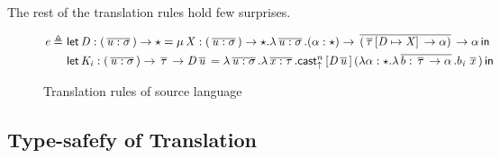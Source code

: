 The rest of the translation rules hold few surprises.

\begin{figure*}
\ottdefnctxtrans{}
\ottdefnpgmtrans{}
\ottdefndecltrans{}
\begin{align*}
\mathit{e}  \triangleq ~  &  \mathsf{let} \, \mathit{D}  :  (  \,\overline{  \mathit{u}  :  \sigma  }\,  )  \rightarrow  \star  =  \mu \, \mathit{X}  :  (  \,\overline{  \mathit{u}  :  \sigma  }\,  )  \rightarrow  \star  .  \lambda  \,\overline{  \mathit{u}  :  \sigma  }\,  .  (  \alpha  :  \star  )  \rightarrow  \,\overline{  (  \,\overline{  \tau  }\,  [  \mathit{D}  \mapsto  \mathit{X}  ] \,  \rightarrow  \alpha  )  }\,  \rightarrow  \alpha \, \mathsf{in} \, \\ &  \mathsf{let} \, \mathit{K_{\mathit{i}}}  :  (  \,\overline{  \mathit{u}  :  \sigma  }\,  )  \rightarrow  \,\overline{  \tau  }\,  \rightarrow  \mathit{D}    \,\overline{  \mathit{u}  }\,  =  \lambda  \,\overline{  \mathit{u}  :  \sigma  }\,  .  \lambda  \,\overline{  \mathit{x}  :  \tau  }\,  .  \mathsf{cast}_{\uparrow}^n \, [  \mathit{D}    \,\overline{  \mathit{u}  }\,  ] \,  (  \lambda  \alpha  :  \star  .  \lambda  \,\overline{  b  :  \,\overline{  \tau  }\,  \rightarrow  \alpha  }\,  .  b_{\mathit{i}} \, \,\overline{  \mathit{x}  }\,  ) \, \mathsf{in} \, 
\end{align*}
\ottdefnpattrans{}
\ottdefnexprtrans{}
\caption{Translation rules of source language}
\label{fig:source:translate}
\end{figure*}

\subsection{Type-safefy of Translation}



